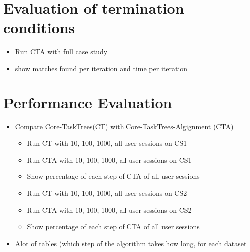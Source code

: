 \section{Evaluation of termination conditions}
\begin{itemize}
	\item Run CTA with full case study
	\item show matches found per iteration and time per iteration
\end{itemize}


\section{Performance Evaluation}
\begin{itemize}
	\item Compare Core-TaskTrees(CT) with Core-TaskTrees-Algignment (CTA)
	\begin{itemize}
		\item Run CT with 10, 100, 1000, all user sessions on CS1
		\item Run CTA with 10, 100, 1000, all user sessions on CS1
		\item Show percentage of each step of CTA of all user sessions
		\item Run CT with 10, 100, 1000, all user sessions on CS2
		\item Run CTA with 10, 100, 1000, all user sessions on CS2
		\item Show percentage of each step of CTA of all user sessions
	\end{itemize}
	\item Alot of tables (which step of the algorithm takes how long, for each dataset
\end{itemize}

